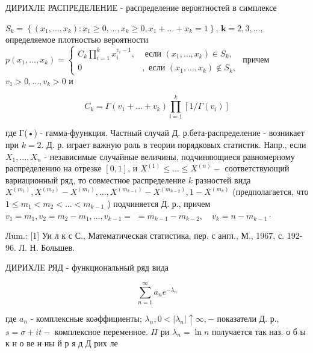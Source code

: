 \documentclass[10pt]{article}
\begin{document}
ДИРИХЛЕ РАСПРЕДЕЛЕНИЕ - распределение вероятностей в симплексе



$S_{k}=\left\{\left(x_{1}, \ldots, x_{k}\right): x_{1} \geqslant 0, \ldots, x_{k} \geqslant 0, x_{1}+\ldots+x_{k}=1\right\}$, $\boldsymbol{k}=2,3, \ldots$, определяемое плотностью вероятности $p\left(x_{1}, \ldots, x_{k}\right)=\left\{\begin{array}{cc}C_{k} \prod_{i=1}^{k} x_{i}^{v_{i}-1}, & \text { если }\left(x_{1}, \ldots, x_{k}\right) \in S_{k}, \\ 0 & , \text { если }\left(x_{1}, \ldots, x_{k}\right) \notin S_{k},\end{array}\right.$ причем $v_{1}>0, \ldots, v_{k}>0$ и



\[

C_{k}=\Gamma\left(v_{1}+\ldots+v_{k}\right) \prod_{i=1}^{k}\left[1 / \Gamma\left(v_{i}\right)\right]

\]



где Г(•) - гамма-фуункция. Частный случай Д. р.бета-распределение - возникает при $k=2$. Д. р. играет важную роль в теории порядковых статистик. Напр., если $X_{1}, \ldots, X_{n}$ - независимые случайные величины, подчиняющиеся равномерному распределению на отрезке $[0,1]$, и $X^{(1)} \leqslant \ldots \leqslant X^{(n)}-$ соответствующий вариационный ряд, то совместное распределение $k$ разностей вида $X^{\left(m_{1}\right)}, X^{\left(m_{2}\right)}-X^{\left(m_{1}\right)}, \ldots, X^{\left(m_{k-1}\right)}-X^{\left(m_{k-2}\right)}, 1-X^{\left(m_{k}\right)}$ (предполагается, что $1 \leqslant m_{1}<m_{2}<\ldots<m_{k-1}$ ) подчиняется Д. р., причем $v_{1}=m_{1}, v_{2}=m_{2}-m_{1}, \ldots, v_{k-1}=$ $=m_{k-1}-m_{k-2}, \quad v_{k}=n-m_{k-1} \cdot$



Лum.: [1] Уи л к с С., Математическая статистика, пер. с англ., М., 1967, с. 192-96. Л. Н. Большев.



ДИРИХЛЕ РЯД - функциональный ряд вида



\[

\sum_{n=1}^{\infty} a_{n} e^{-\lambda_{n}}

\]



где $a_{n}$ - комплексные коәффициенты; $\lambda_{n}, 0<\left|\lambda_{n}\right| \uparrow \infty,-$ показатели Д. р., $s=\sigma+i t-$ комплексное переменное. $\Pi$ ри $\lambda_{n}=\ln n$ получается так наз. о б ы к н о ве н ны й р я д Д рих ле
\end{document}
